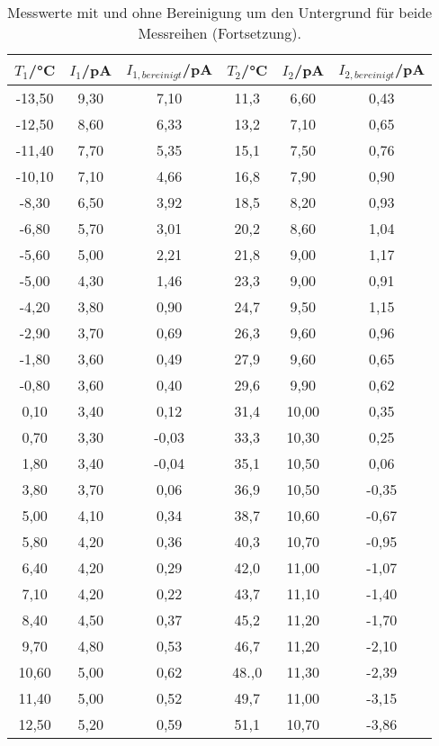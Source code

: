   \begin{table}[htp]
  	\begin{center}
      \caption{Messwerte mit und ohne Bereinigung um den Untergrund für beide Messreihen (Fortsetzung).}
      \label{tab:messwerte2}
  		\begin{tabular}{cccccc}
  		\toprule
  			{$T_1$/°C} & {$I_1$/pA} & {$I_{1,bereinigt}$/pA} & {$T_2$/°C} & {$I_2$/pA} & {$I_{2,bereinigt}$/pA}\\
  			\midrule
			-13,50 & 9,30 & 7,10 & 11,3 & 6,60 & 0,43\\
			-12,50 & 8,60 & 6,33 & 13,2 & 7,10 & 0,65\\
			-11,40 & 7,70 & 5,35 & 15,1 & 7,50 & 0,76\\
			-10,10 & 7,10 & 4,66 & 16,8 & 7,90 & 0,90\\
			-8,30 & 6,50 & 3,92 & 18,5 & 8,20 & 0,93\\
			-6,80 & 5,70 & 3,01 & 20,2 & 8,60 & 1,04\\
			-5,60 & 5,00 & 2,21 & 21,8 & 9,00 & 1,17\\
			-5,00 & 4,30 & 1,46 & 23,3 & 9,00 & 0,91\\
			-4,20 & 3,80 & 0,90 & 24,7 & 9,50 & 1,15\\
			-2,90 & 3,70 & 0,69 & 26,3 & 9,60 & 0,96\\
			-1,80 & 3,60 & 0,49 & 27,9 & 9,60 & 0,65\\
			-0,80 & 3,60 & 0,40 & 29,6 & 9,90 & 0,62\\
			0,10 & 3,40 & 0,12 & 31,4 & 10,00 & 0,35\\
			0,70 & 3,30 & -0,03 & 33,3 & 10,30 & 0,25\\
			1,80 & 3,40 & -0,04 & 35,1 & 10,50 & 0,06\\
			3,80 & 3,70 & 0,06 & 36,9 & 10,50 & -0,35\\
			5,00 & 4,10 & 0,34 & 38,7 & 10,60 & -0,67\\
			5,80 & 4,20 & 0,36 & 40,3 & 10,70 & -0,95\\
			6,40 & 4,20 & 0,29 & 42,0 & 11,00 & -1,07\\
			7,10 & 4,20 & 0,22 & 43,7 & 11,10 & -1,40\\
			8,40 & 4,50 & 0,37 & 45,2 & 11,20 & -1,70\\
			9,70 & 4,80 & 0,53 & 46,7 & 11,20 & -2,10\\
			10,60 & 5,00 & 0,62 & 48.,0& 11,30 & -2,39\\
			11,40 & 5,00 & 0,52 & 49,7 & 11,00 & -3,15\\
			12,50 & 5,20 & 0,59 & 51,1 & 10,70 & -3,86\\

\end{tabular}
\end{center}
\end{table}
